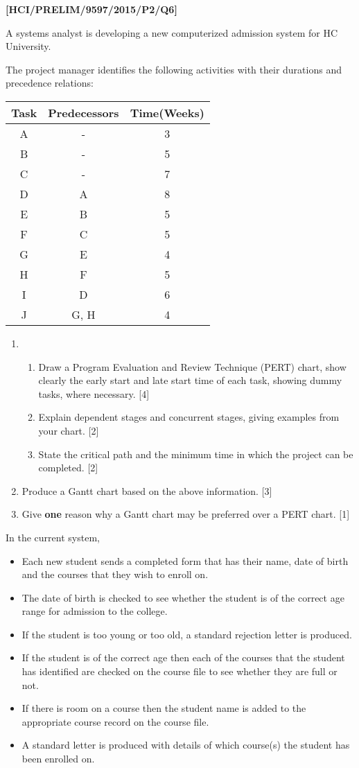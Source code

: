 \item \textbf{{[}HCI/PRELIM/9597/2015/P2/Q6{]} }

A systems analyst is developing a new computerized admission system
for HC University. 

The project manager identifies the following activities with their
durations and precedence relations: 
\noindent \begin{center}
\begin{tabular}{|c|c|c|}
\hline 
Task & Predecessors & Time(Weeks)\tabularnewline
\hline 
A & - & 3\tabularnewline
\hline 
B & - & 5\tabularnewline
\hline 
C & - & 7\tabularnewline
\hline 
D & A & 8\tabularnewline
\hline 
E & B & 5\tabularnewline
\hline 
F & C & 5\tabularnewline
\hline 
G & E & 4\tabularnewline
\hline 
H & F & 5\tabularnewline
\hline 
I & D & 6\tabularnewline
\hline 
J & G, H & 4\tabularnewline
\hline 
\end{tabular}
\par\end{center}
\begin{enumerate}
\item {}
\begin{enumerate}
\item Draw a Program Evaluation and Review Technique (PERT) chart, show
clearly the early start and late start time of each task, showing
dummy tasks, where necessary. \hfill{}{[}4{]}
\item Explain dependent stages and concurrent stages, giving examples from
your chart. \hfill{}{[}2{]}
\item State the critical path and the minimum time in which the project
can be completed. \hfill{}{[}2{]}
\end{enumerate}
\item Produce a Gantt chart based on the above information. \hfill{}{[}3{]}
\item Give \textbf{one} reason why a Gantt chart may be preferred over a
PERT chart. \hfill{}{[}1{]}
\end{enumerate}
In the current system,
\begin{itemize}
\item Each new student sends a completed form that has their name, date
of birth and the courses that they wish to enroll on. 
\item The date of birth is checked to see whether the student is of the
correct age range for admission to the college. 
\item If the student is too young or too old, a standard rejection letter
is produced. 
\item If the student is of the correct age then each of the courses that
the student has identified are checked on the course file to see whether
they are full or not. 
\item If there is room on a course then the student name is added to the
appropriate course record on the course file. 
\item A standard letter is produced with details of which course(s) the
student has been enrolled on. 
\end{itemize}
